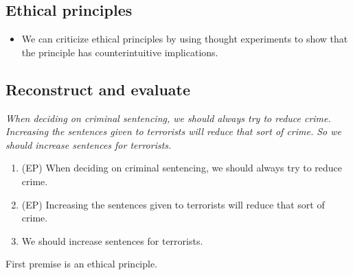 \subsection{Ethical principles}

\begin{itemize}
    \item We can criticize ethical principles by using thought experiments
        to show that the principle has counterintuitive implications.
\end{itemize}

\subsection{Reconstruct and evaluate}

\textit{When deciding on criminal sentencing, we should always try
to reduce crime. Increasing the sentences given to terrorists will reduce that
sort of crime. So we should increase sentences for terrorists.}

\begin{enumerate}
    \item (EP) When deciding on criminal sentencing, we should always try to
        reduce crime.
    \item (EP) Increasing the sentences given to terrorists will
        reduce that sort of crime.
    \item We should increase sentences for terrorists.
\end{enumerate}

First premise is an ethical principle.